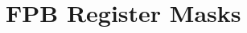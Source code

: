 \hypertarget{group___f_p_b___register___masks}{}\section{F\+P\+B Register Masks}
\label{group___f_p_b___register___masks}
